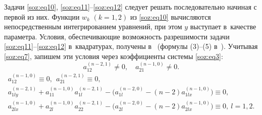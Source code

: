 Задачи \eqref{soz:eq10}, \eqref{soz:eq11}--\eqref{soz:eq12} следует решать последовательно начиная с первой из них.
Функции $w_{k}$ $(k=1, 2)$ из \eqref{soz:eq10} вычисляются непосредственным интегрированием уравнений, 
при этом $y$ выступает в~качестве параметра. 
Условия, обеспечивающие  возможность  разрешимости задачи \eqref{soz:eq11}--\eqref{soz:eq12} в~квадратурах, получены в~\cite{soz:bib:sozontova} (формулы (3)--(5) в~\cite{soz:bib:sozontova}). 
Учитывая \eqref{soz:eq7}, запишем эти условия через коэффициенты системы \eqref{soz:eq3}: 
\begin{equation}
\label{soz:eq13}
a_{12}^{(n-2,1)}\neq0,\quad  a_{21}^{(n-1,0)}\neq0.
\end{equation}
\begin{equation}
\label{soz:eq14}
\begin{array}{l}
a_{12}^{(n-1,0)}\equiv0,\ \ a_{21}^{(n-2,1)}\equiv0,\\[2mm]
a_{1ly}^{(n-2,1)}+a_{11}^{(n-1,0)}a_{1l}^{(n-2,1)}-\bigl(a_{1l}^{(n-2,0)}-(n-2)a_{1lx}^{(n-1,0)}\bigr)\equiv0,\\[2mm]
a_{2lx}^{(n-1,0)}+a_{2l}^{(n-1,0)}a_{22}^{(n-2,1)}-\bigl(a_{2l}^{(n-2,0)}-(n-2)a_{2lx}^{(n-1,0)}\bigr)\equiv0,\ l=1,2.\\
\end{array}
\end{equation}
